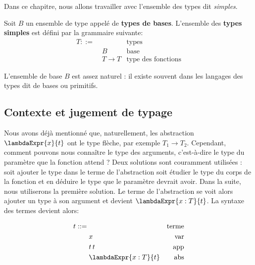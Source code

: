 Dans ce chapitre, nous allons travailler avec l'ensemble des types dit
\textit{simples}.

\begin{definition}
  \label{def:simply-typed-lambda-calculus-types}
  Soit $B$ un ensemble de type appelé de \textbf{types de bases}.
  L'ensemble des \textbf{types simples} est défini par la grammaire suivante:
  \begin{align*}
    T ::= & \, & \text{types} \\
          & \; B & \text{base} \\
          & \; T \rightarrow T & \text{type des fonctions}
  \end{align*}
\end{definition}

L'ensemble de base $B$ est assez naturel : il existe souvent dans les langages
des types dit de bases ou primitifs.



\subsection*{Contexte et jugement de typage}

Nous avons déjà mentionné que, naturellement, les abstraction $\lambdaExpr{x}{t}$ ont le type
flèche, par exemple $T_{1} \rightarrow T_{2}$. Cependant, comment pouvons nous
connaître le type des arguments, c'est-à-dire le type du paramètre que la
fonction attend ? Deux solutions sont couramment utilisées : soit ajouter le type
dans le terme de l'abstraction soit étudier le type du corps de la fonction et
en déduire le type que le paramètre devrait avoir.
Dans la suite, nous utiliserons la première solution. Le terme de l'abstraction
se voit alors ajouter un type à son argument et devient $\lambdaExpr{x : T}{t}$.
La syntaxe des termes devient alors:

\begin{align*}
  \label{def:simply-typed-lambda-calculus-terms}
  t ::= & \, & \text{terme} \\
        & \; x & \text{var} \\
        & \; t \, t & \text{app} \\
        & \; \lambdaExpr{x : T}{t} & \text{abs}
\end{align*}

